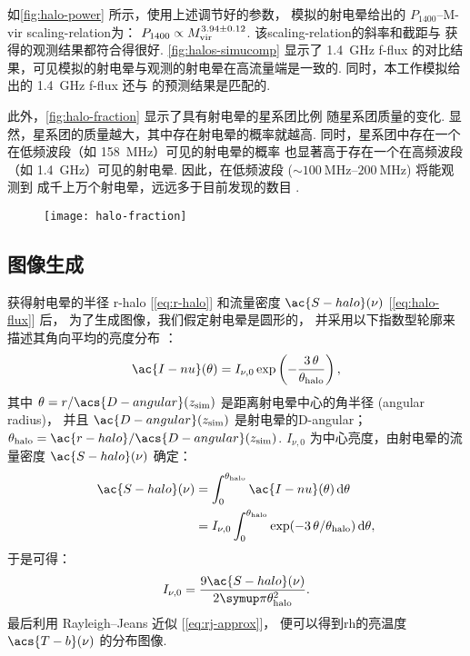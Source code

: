 如\autoref{fig:halo-power} 所示，使用上述调节好的参数，
模拟的射电晕给出的 $P_{1400}$--\ac{M-vir} \ac{scaling-relation}为：
$P_{1400} \propto M_{\mathrm{vir}}^{3.94 \pm 0.12}$.
该\ac{scaling-relation}的斜率和截距与 
获得的观测结果都符合得很好.
\autoref{fig:halos-simucomp} 显示了 \SI{1.4}{\GHz} \ac{f-flux}
的对比结果，可见模拟的射电晕与观测的射电晕在高流量端是一致的.
同时，本工作模拟给出的 \SI{1.4}{\GHz} \ac{f-flux}
还与  的预测结果是匹配的.

此外，\autoref{fig:halo-fraction} 显示了具有射电晕的星系团比例
随星系团质量的变化.
显然，星系团的质量越大，其中存在射电晕的概率就越高.
同时，星系团中存在一个在低频波段（如 \SI{158}{\MHz}）可见的射电晕的概率
也显著高于存在一个在高频波段（如 \SI{1.4}{\GHz}）可见的射电晕.
因此，在低频波段 ($\sim \SIrange{100}{200}{\MHz}$) 将能观测到
成千上万个射电晕，远远多于目前发现的数目 \cite{cassano2012,cassano2015}.

\begin{figure}[htp]
  \centering
  \texttt{[image: halo-fraction]}
  \label{fig:halo-fraction}
\end{figure}

\subsection{图像生成}
\label{sec:halo-maps}

获得射电晕的半径 \ac{r-halo} [\autoref{eq:r-halo}]
和流量密度 $\ac{S-halo}(\nu)$ [\autoref{eq:halo-flux}] 后，
为了生成图像，我们假定射电晕是圆形的，
并采用以下指数型轮廓来描述其角向平均的亮度分布 \cite{murgia2009}：
\begin{equation}
  \label{eq:halo-profile}
  \ac{I-nu}(\theta) =
    I_{\nu,0} \exp\left( -\frac{3\,\theta}{\theta_{\R{halo}}} \right) ,
\end{equation}
其中
$\theta = r / \acs{D-angular}(z_{\R{sim}})$ 是距离射电晕中心的角半径
(angular radius)，
并且 $\ac{D-angular}(z_{\R{sim}})$ 是射电晕的\acl{D-angular}；
$\theta_{\R{halo}} = \ac{r-halo} / \acs{D-angular}(z_{\R{sim}})$.
$I_{\nu,0}$ 为中心亮度，由射电晕的流量密度 $\ac{S-halo}(\nu)$ 确定：
\begin{align}
  \ac{S-halo}(\nu)
    & = \int_0^{\theta_{\R{halo}}} \ac{I-nu}(\theta) \,\D{\theta} \\
    & = I_{\nu,0} \int_0^{\theta_{\R{halo}}}
        \exp( -3\,\theta / \theta_{\R{halo}} ) \,\D{\theta} ,
\end{align}
于是可得：
\begin{equation}
  I_{\nu,0} = \frac{9 \ac{S-halo}(\nu)}{2\Cpi \theta^2_{\R{halo}}} .
\end{equation}
最后利用 Rayleigh--Jeans 近似 [\autoref{eq:rj-approx}]，
便可以得到\ac{rh}的亮温度 $\acs{T-b}(\nu)$ 的分布图像.

